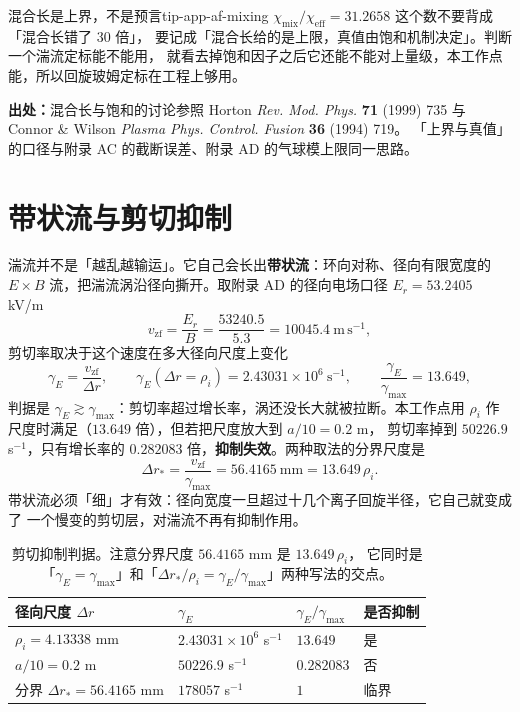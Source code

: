 \begin{tip}{混合长是上界，不是预言}{tip-app-af-mixing}
$\chi_{\mathrm{mix}}/\chi_{\mathrm{eff}}=31.2658$ 这个数不要背成「混合长错了 30 倍」，
要记成「混合长给的是上限，真值由饱和机制决定」。判断一个湍流定标能不能用，
就看去掉饱和因子之后它还能不能对上量级，本工作点能，所以回旋玻姆定标在工程上够用。
\end{tip}

{\footnotesize
\textbf{出处：}混合长与饱和的讨论参照 Horton \emph{Rev. Mod. Phys.} \textbf{71} (1999) 735 与
Connor \& Wilson \emph{Plasma Phys. Control. Fusion} \textbf{36} (1994) 719。
「上界与真值」的口径与附录 AC 的截断误差、附录 AD 的气球模上限同一思路。
}

\section{带状流与剪切抑制}
\label{sec:app-af-zonal}

湍流并不是「越乱越输运」。它自己会长出\textbf{带状流}：环向对称、径向有限宽度的
$E\times B$ 流，把湍流涡沿径向撕开。取附录 AD 的径向电场口径
$E_r=53.2405$ kV/m
\begin{equation}
v_{\mathrm{zf}}=\frac{E_r}{B}=\frac{53240.5}{5.3}=10045.4\ \mathrm{m\,s^{-1}},
\label{eq:app-af-vzf}
\end{equation}
剪切率取决于这个速度在多大径向尺度上变化
\begin{equation}
\gamma_E=\frac{v_{\mathrm{zf}}}{\Delta r},
\qquad
\gamma_E(\Delta r=\rho_i)=2.43031\times10^{6}\ \mathrm{s^{-1}},
\qquad
\frac{\gamma_E}{\gamma_{\max}}=13.649,
\label{eq:app-af-gammae}
\end{equation}
判据是 $\gamma_E\gtrsim\gamma_{\max}$：剪切率超过增长率，涡还没长大就被拉断。本工作点用
$\rho_i$ 作尺度时满足（$13.649$ 倍），但若把尺度放大到 $a/10=0.2$ m，
剪切率掉到 $50226.9$ s$^{-1}$，只有增长率的 $0.282083$ 倍，\textbf{抑制失效}。两种取法的分界尺度是
\begin{equation}
\Delta r_*=\frac{v_{\mathrm{zf}}}{\gamma_{\max}}=56.4165\ \mathrm{mm}=13.649\,\rho_i .
\label{eq:app-af-suppress}
\end{equation}
带状流必须「细」才有效：径向宽度一旦超过十几个离子回旋半径，它自己就变成了
一个慢变的剪切层，对湍流不再有抑制作用。

\begin{table}[htbp]
\centering
\small
\caption{剪切抑制判据。注意分界尺度 $56.4165$ mm 是 $13.649\,\rho_i$，
它同时是「$\gamma_E=\gamma_{\max}$」和「$\Delta r_*/\rho_i=\gamma_E/\gamma_{\max}$」两种写法的交点。}
\label{tab:app-af-zonal}
\begin{tabular}{p{3.4cm}p{3.4cm}p{3.0cm}p{3.4cm}}
\toprule
径向尺度 $\Delta r$ & $\gamma_E$ & $\gamma_E/\gamma_{\max}$ & 是否抑制 \\
\midrule
$\rho_i=4.13338$ mm & $2.43031\times10^{6}$ s$^{-1}$ & $13.649$ & 是 \\
$a/10=0.2$ m & $50226.9$ s$^{-1}$ & $0.282083$ & 否 \\
分界 $\Delta r_*=56.4165$ mm & $178057$ s$^{-1}$ & $1$ & 临界 \\
\bottomrule
\end{tabular}

\end{table}

